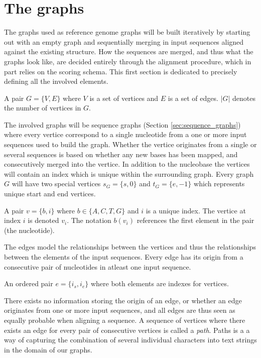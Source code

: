 \documentclass[thesis.tex]{subfiles}
\begin{document}
{\section{The graphs}
The graphs used as reference genome graphs will be built iteratively by starting out with an empty graph and sequentially merging in input sequences aligned against the existing structure. How the sequences are merged, and thus what the graphs look like, are decided entirely through the alignment procedure, which in part relies on the scoring schema. This first section is dedicated to precisely defining all the involved elements. 
\begin{defn}
  A pair $G=\{V,E\}$ where $V$ is a set of vertices and $E$ is a set of edges. $|G|$ denotes the number of vertices in $G$.
\end{defn}
The involved graphs will be sequence graphs (Section \ref{sec:sequence_graphs}) where every vertice correspond to a single nucleotide from a one or more input sequences used to build the graph. Whether the vertice originates from a single or several sequences is based on whether any new bases has been mapped, and consecutively merged into the vertice. In addition to the nucleobase the vertices will contain an index which is unique within the surrounding graph. Every graph $G$ will have two special vertices $s_G=\{s, 0\}$ and $t_G=\{e, -1\}$ which represents unique start and end vertices. 
\begin{defn}
  A pair $v=\{b, i\}$ where $b \in \{A, C, T, G\}$ and $i$ is a unique index. The vertice at index $i$ is denoted $v_i$. The notation $b(v_i)$ references the first element in the pair (the nucleotide).
\end{defn}
The edges model the relationships between the vertices and thus the relationships between the elements of the input sequences. Every edge has its origin from a consecutive pair of nucleotides in atleast one input sequence.
\begin{defn}
  An ordered pair $e=\{i_s, i_e\}$ where both elements are indexes for vertices. 
\end{defn}
There exists no information storing the origin of an edge, or whether an edge originates from one or more input sequences, and all edges are thus seen as equally probable when aligning a sequence. A sequence of vertices where there exists an edge for every pair of consecutive vertices is called a \textit{path}. Paths is a a way of capturing the combination of several individual characters into text strings in the domain of our graphs.
}
\end{document}
